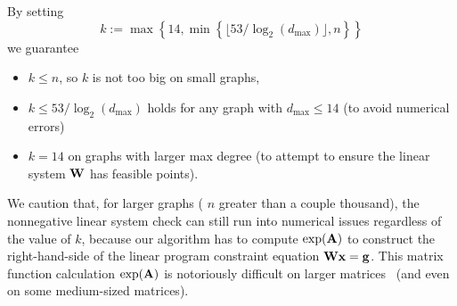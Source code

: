 \documentclass[a4paper,10pt]{article}
\providecommand{\dmax}{d_{\max}}
\begin{document}
By setting
\begin{equation}\label{eqn:def-max-power}
  k := \max\left\{ 14,  \min\left\{ \lfloor 53 / \log_2( \dmax ) \rfloor , n\right\}  \right\}
\end{equation}
we guarantee
\begin{itemize}
  \item  $k \leq n$, so $k$ is not too big on small graphs,
  \item  $k \leq 53 / \log_2(\dmax)$ holds for any graph with $\dmax \leq 14$ (to avoid numerical errors)
  \item  $k = 14$ on graphs with larger max degree (to attempt to ensure the linear system $\textbf{W}$ has feasible points).
\end{itemize}
We caution that, for larger graphs ( $n$ greater than a couple thousand), the nonnegative linear system check can still run into numerical issues regardless of the value of $k$, because our algorithm has to compute $\exp(\textbf{A})$ to construct the right-hand-side of the linear program constraint equation $\textbf{W}\textbf{x} = \textbf{g}$. This matrix function calculation $\exp(\textbf{A})$ is notoriously difficult on larger matrices~\cite{moler2003nineteen} (and even on some medium-sized matrices).



{\footnotesize


}
\end{document}
